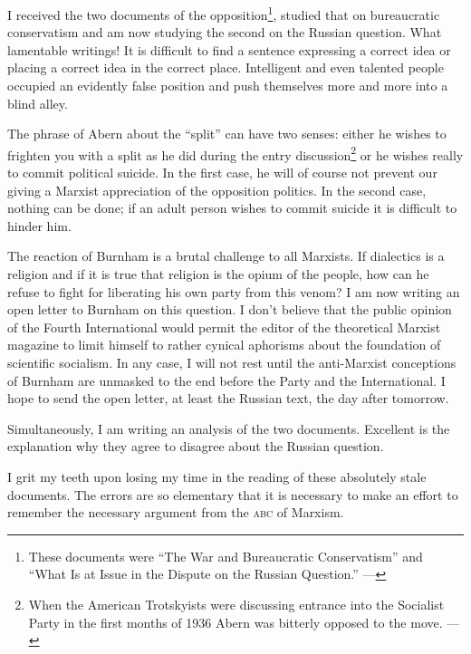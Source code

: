 I received the two documents of the opposition\footnote{These documents were ``The War and Bureaucratic Conservatism'' and ``What Is at Issue in the Dispute on the Russian Question.'' ---\ed}, studied that on bureaucratic conservatism and am now studying the second on the Russian question. What lamentable writings! It is difficult to find a sentence expressing a correct idea or placing a correct idea in the correct place. Intelligent and even talented people occupied an evidently false position and push themselves more and more into a blind alley.

The phrase of Abern about the “split” can have two senses: either he wishes to frighten you with a split as he did during the entry discussion\footnote{When the American Trotskyists were discussing entrance into the Socialist Party in the first months of 1936 Abern was bitterly opposed to the move. ---\ed} or he wishes really to commit political suicide. In the first case, he will of course not prevent our giving a Marxist appreciation of the opposition politics. In the second case, nothing can be done; if an adult person wishes to commit suicide it is difficult to hinder him.

The reaction of Burnham is a brutal challenge to all Marxists. If dialectics is a religion and if it is true that religion is the opium of the people, how can he refuse to fight for liberating his own party from this venom? I am now writing an open letter to Burnham on this question. I don’t believe that the public opinion of the Fourth International would permit the editor of the theoretical Marxist magazine to limit himself to rather cynical aphorisms about the foundation of scientific socialism. In any case, I will not rest until the anti-Marxist conceptions of Burnham are unmasked to the end before the Party and the International. I hope to send the open letter, at least the Russian text, the day after tomorrow.

Simultaneously, I am writing an analysis of the two documents. Excellent is the explanation why they agree to disagree about the Russian question.

I grit my teeth upon losing my time in the reading of these absolutely stale documents. The errors are so elementary that it is necessary to make an effort to remember the necessary argument from the \textsc{abc} of Marxism.

\enlargethispage{1 \baselineskip}

